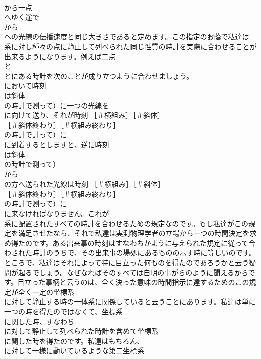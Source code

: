 \documentclass[8pt]{extreport}
\begin{document}
\begin{CJK}{UTF8}{min}
\\	から一点 
\\	へゆく途で 
\\	から 
\\	への光線の伝播速度と同じ大きさであると定めます。この指定のお蔭で私達は 
\\	系に対し種々の点に静止して列べられた同じ性質の時計を実際に合わせることが出来るようになります。例えば二点 
\\	と 
\\	とにある時計を次のことが成り立つように合わせましょう。
\\	において時刻 
\\	は斜体］
\\	の時計で測って）に一つの光線を 
\\	に向けて送り、それが時刻 ［＃横組み］［＃斜体］
\\	［＃斜体終わり］［＃横組み終わり］
\\	の時計で計って）に 
\\	に到着するとしますと、逆に時刻 
\\	は斜体］
\\	の時計で測って）
\\	から 
\\	の方へ送られた光線は時刻 ［＃横組み］［＃斜体］
\\	［＃斜体終わり］［＃横組み終わり］
\\	の時計で測って）に 
\\	に来なければなりません。これが 
\\	系に配置されたすべての時計を合わせるための規定なのです。もし私達がこの規定を満足させたなら、それで私達は実測物理学者の立場から一つの時間決定を求め得たのです。ある出来事の時刻はすなわちかように与えられた規定に従って合わされた時計のうちで、その出来事の場処にあるものの示す時に等しいのです。
\\	ところで、私達はそれによって特に目立った何ものを得たのであろうかと云う疑問が起るでしょう。なぜなればそのすべては自明の事がらのように聞えるからです。目立った事柄と云うのは、全く決った意味の時間指示に達するためのこの規定が全く一定の坐標系 
\\	に対して静止する時の一体系に関係していると云うことにあります。私達は単に一つの時を得たのではなくて、坐標系 
\\	に関した時、すなわち 
\\	に対して静止して列べられた時計を含めて坐標系 
\\	に関した時を得たのです。私達はもちろん、
\\	に対して一様に動いているような第二坐標系 

\end{CJK}
\end{document}
